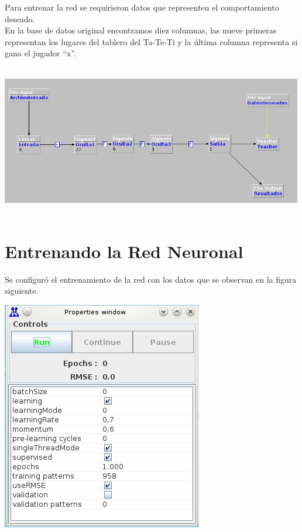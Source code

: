 \documentclass[12pt,titlepage]{article}
\begin{document}
Para entrenar la red se requirieron datos que representen el comportamiento deseado. \\
En la base de datos original encontramos diez columnas, las nueve primeras representan los lugares del tablero del Ta-Te-Ti y la \'ultima columna representa si gana el jugador ``x''.

\begin{center}
 \includegraphics[width=500,height=250]{./Images/RN.png}
\end{center}

\section{Entrenando la Red Neuronal}
Se configur\'o el entrenamiento de la red con los datos que se observan en la figura siguiente.

\begin{center}
 \includegraphics{./Images/configuracion-corridas.png}
\end{center}
\end{document}
